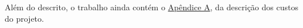 Além do descrito, o trabalho ainda contém o \hyperref[sec:custo]{Apêndice A}, da descrição dos custos do projeto.

%
